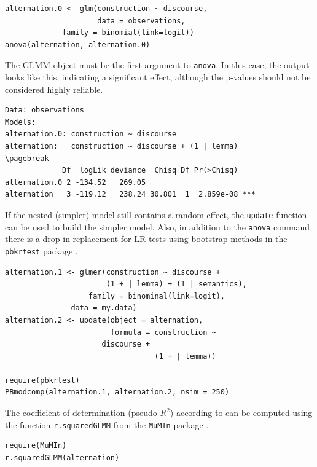 \documentclass[a4paper,12pt]{article}
\begin{document}
\begin{lstlisting}
alternation.0 <- glm(construction ~ discourse,
                     data = observations,
		     family = binomial(link=logit))
anova(alternation, alternation.0)
\end{lstlisting}

The GLMM object must be the first argument to \texttt{anova}.
In this case, the output looks like this, indicating a significant effect, although the p-values should not be considered highly reliable.

\vspace{0.5\baselineskip}

\begin{lstlisting}
Data: observations
Models:
alternation.0: construction ~ discourse
alternation:   construction ~ discourse + (1 | lemma)
\pagebreak
             Df  logLik deviance  Chisq Df Pr(>Chisq)    
alternation.0 2 -134.52   269.05                         
alternation   3 -119.12   238.24 30.801  1  2.859e-08 ***
\end{lstlisting}

If the nested (simpler) model still contains a random effect, the \texttt{update} function can be used to build the simpler model.
Also, in addition to the \texttt{anova} command, there is a drop-in replacement for LR tests using bootstrap methods in the \texttt{pbkrtest} package \citep{HalekohHojsgaard2014}.

\vspace{0.5\baselineskip}

\begin{lstlisting}
alternation.1 <- glmer(construction ~ discourse +
                       (1 + | lemma) + (1 | semantics),
	               family = binominal(link=logit),
		       data = my.data)
alternation.2 <- update(object = alternation,
                        formula = construction ~
			          discourse +
                                  (1 + | lemma))

require(pbkrtest)
PBmodcomp(alternation.1, alternation.2, nsim = 250)
\end{lstlisting}

The coefficient of determination (pseudo-$R^2$) according to \citet{NakagawaSchielzeth2013} can be computed using the function \texttt{r.squaredGLMM} from the \texttt{MuMIn} package \citep{Barton2016}.

\vspace{0.5\baselineskip}

\begin{lstlisting}
require(MuMIn)
r.squaredGLMM(alternation)
\end{lstlisting}
\end{document}
